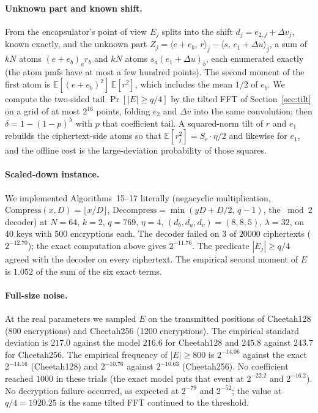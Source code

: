\documentclass[11pt,a4paper]{article}
\theoremstyle{definition}
\theoremstyle{remark}
\newcommand{\E}{\mathbb{E}}
\newcommand{\dfr}{\delta}
\begin{document}
\paragraph{Unknown part and known shift.}
From the encapsulator's point of view $E_j$ splits into the shift
$d_j=e_{2,j}+\Delta v_j$, known exactly, and the unknown part
$Z_j=\langle e+e_b,\,r\rangle_j-\langle s,\,e_1+\Delta u\rangle_j$, a sum of
$kN$ atoms $(e+e_b)_a r_{b}$ and $kN$ atoms $s_a(e_1+\Delta u)_{b}$, each
enumerated exactly (the atom pmfs have at most a few hundred points). The
second moment of the first atom is $\E[(e+e_b)^2]\,\E[r^2]$, which includes the
mean $1/2$ of $e_b$. We compute the two-sided tail $\Pr[|E|\ge q/4]$ by the
tilted FFT of Section~\ref{sec:tilt} on a grid of at most $2^{16}$ points,
folding $e_2$ and $\Delta v$ into the same convolution; then
$\dfr=1-(1-p)^{\lambda}$ with $p$ that coefficient tail. A squared-norm
tilt of $r$ and $e_1$ rebuilds the ciphertext-side atoms so that
$\E[r_j^2]=S_r\cdot\eta/2$ and likewise for $e_1$, and the offline cost
is the large-deviation probability of those squares.

\paragraph{Scaled-down instance.}
We implemented Algorithms~15--17 literally (negacyclic multiplication,
$\mathrm{Compress}(x,D)=\lfloor x/D\rfloor$,
$\mathrm{Decompress}=\min(yD+D/2,\,q-1)$, the $\bmod 2$ decoder) at
$N=64$, $k=2$, $q=769$, $\eta=4$, $(d_b,d_u,d_v)=(8,8,5)$, $\lambda=32$, on
40 keys with 500 encryptions each. The decoder failed on $3$ of $20000$
ciphertexts ($2^{-12.70}$); the exact computation above gives $2^{-11.76}$.
The predicate $|E_j|\ge q/4$ agreed with the decoder on every ciphertext.
The empirical second moment of $E$ is $1.052$ of the sum of the six exact
terms.

\paragraph{Full-size noise.}
At the real parameters we sampled $E$ on the transmitted positions of
Cheetah128 (800 encryptions) and Cheetah256 (1200 encryptions). The
empirical standard deviation is $217.0$ against the model $216.6$ for
Cheetah128 and $245.8$ against $243.7$ for Cheetah256. The empirical
frequency of $|E|\ge800$ is $2^{-14.06}$ against the exact $2^{-14.16}$
(Cheetah128) and $2^{-10.76}$ against $2^{-10.63}$ (Cheetah256). No
coefficient reached $1000$ in these trials (the exact model puts that
event at $2^{-22.2}$ and $2^{-16.2}$). No decryption failure occurred, as
expected at $2^{-79}$ and $2^{-52}$; the value at $q/4=1920.25$ is the
same tilted FFT continued to the threshold.
\end{document}
